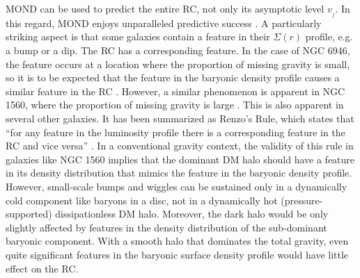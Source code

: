 \documentclass[fleqn,usenatbib,useAMS]{mnras} %
\begin{document}
MOND can be used to predict the entire RC, not only its asymptotic level $v_{_f}$. In this regard, MOND enjoys unparalleled predictive success \citep[extensively reviewed in][]{Famaey_McGaugh_2012}. A particularly striking aspect is that some galaxies contain a feature in their $\Sigma \left( r \right)$ profile, e.g. a bump or a dip. The RC has a corresponding feature. In the case of NGC 6946, the feature occurs at a location where the proportion of missing gravity is small, so it is to be expected that the feature in the baryonic density profile causes a similar feature in the RC \citep{McGaugh_2014}. However, a similar phenomenon is apparent in NGC 1560, where the proportion of missing gravity is large \citep{Gentile_2010}. This is also apparent in several other galaxies. It has been summarized as Renzo's Rule, which states that ``for any feature in the luminosity profile there is a corresponding feature in the RC and vice versa'' \citep{Sancisi_2004}. In a conventional gravity context, the validity of this rule in galaxies like NGC 1560 implies that the dominant DM halo should have a feature in its density distribution that mimics the feature in the baryonic density profile. However, small-scale bumps and wiggles can be sustained only in a dynamically cold component like baryons in a disc, not in a dynamically hot (pressure-supported) dissipationless DM halo. Moreover, the dark halo would be only slightly affected by features in the density distribution of the sub-dominant baryonic component. With a smooth halo that dominates the total gravity, even quite significant features in the baryonic surface density profile would have little effect on the RC.
\end{document}
